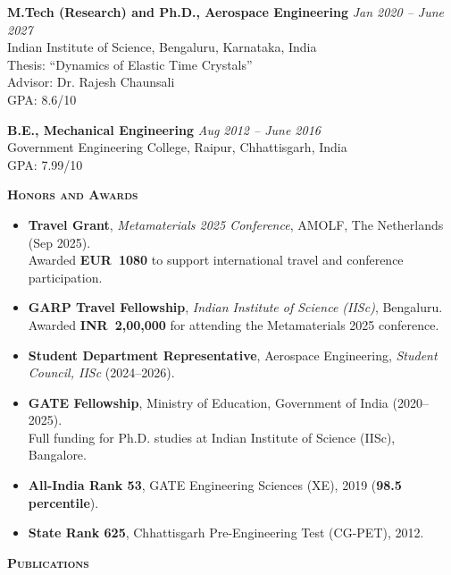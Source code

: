 \documentclass[11pt]{article}
\renewcommand{\section}[1]{%
  \par\vspace{12pt}%
  {\centerline{\large\bfseries\scshape #1}}\par\vspace{-6pt}%
  \noindent{\color{black!20}\rule{\linewidth}{1pt}}\par\vspace{5pt}%
}
\newenvironment{list2}{\begin{itemize}[leftmargin=0.2in,itemsep=0pt,topsep=2pt,parsep=0pt]}{\end{itemize}}
\begin{document}
\textbf{M.Tech (Research) and Ph.D., Aerospace Engineering} \hfill \textit{Jan 2020 -- June 2027}\\
Indian Institute of Science, Bengaluru, Karnataka, India\\
{\small Thesis: ``Dynamics of Elastic Time Crystals''\\
Advisor: Dr. Rajesh Chaunsali}\\
GPA: 8.6/10

\vspace{6pt}
\textbf{B.E., Mechanical Engineering} \hfill \textit{Aug 2012 -- June 2016}\\
Government Engineering College, Raipur, Chhattisgarh, India\\
GPA: 7.99/10

\section{Honors and Awards}
\begin{list2}
\item \textbf{Travel Grant}, \textit{Metamaterials 2025 Conference}, AMOLF, The Netherlands (Sep 2025). \\
Awarded \textbf{EUR~1080} to support international travel and conference participation.
\vspace{4pt}
\item \textbf{GARP Travel Fellowship}, \textit{Indian Institute of Science (IISc)}, Bengaluru. \\
Awarded \textbf{INR~2,00,000} for attending the Metamaterials 2025 conference.
\vspace{4pt}
\item \textbf{Student Department Representative}, Aerospace Engineering, \textit{Student Council, IISc} (2024--2026).
\vspace{4pt}
\item \textbf{GATE Fellowship}, Ministry of Education, Government of India (2020--2025). \\
Full funding for Ph.D. studies at Indian Institute of Science (IISc), Bangalore.
\vspace{4pt}
\item \textbf{All-India Rank 53}, GATE Engineering Sciences (XE), 2019 (\textbf{98.5 percentile}).
\vspace{4pt}
\item \textbf{State Rank 625}, Chhattisgarh Pre-Engineering Test (CG-PET), 2012.
\end{list2}

\section{Publications}
\end{document}
